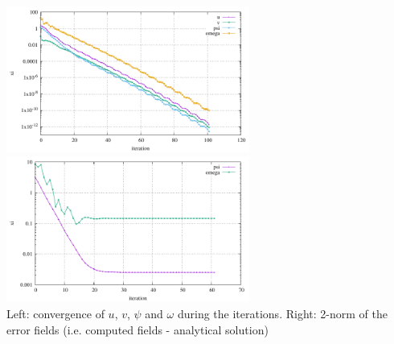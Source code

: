 \begin{center}
\includegraphics[width=8cm]{python_codes/fieldstone_154/results/conv.pdf}
\includegraphics[width=8cm]{python_codes/fieldstone_154/results/errors.pdf}\\
{\captionfont Left: convergence of $u$, $v$, $\psi$ and $\omega$ during the iterations. Right: 2-norm of the error fields (i.e. 
computed fields - analytical solution)}
\end{center}

